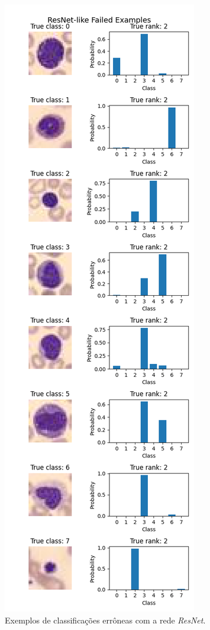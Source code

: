\documentclass[final,5p]{elsarticle}
\numberwithin{equation}{section}
\begin{document}
        \begin{figure}[H]
            \includegraphics[width=0.8\columnwidth]{ResNet_fails.png}
            \caption{Exemplos de classificações errôneas com a rede \emph{ResNet}.}\label{fig:ErrosResNet}
        \end{figure}
\end{document}
